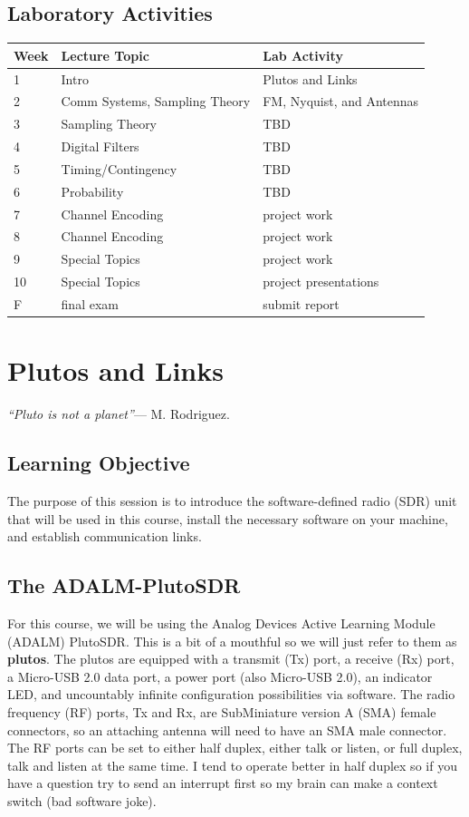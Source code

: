 \subsection{Laboratory Activities}
\begin{tabular}{ | m{1cm} | m{8cm}| m{8cm} |} 
    \hline
    Week & Lecture Topic & Lab Activity \\
    \hline
    1 & Intro & Plutos and Links\\ \hline
    2 & Comm Systems, Sampling Theory & FM, Nyquist, and Antennas \\ \hline
    3 & Sampling Theory & TBD\\ \hline
    4 & Digital Filters & TBD\\ \hline
    5 & Timing/Contingency & TBD \\ \hline
    6 & Probability & TBD \\ \hline
    7 & Channel Encoding & project work \\ \hline
    8 & Channel Encoding &  project work \\ \hline
    9 & Special Topics & project work \\ \hline
    10 & Special Topics & project presentations \\ \hline
    F & final exam & submit report \\ \hline 
\end{tabular}
\newpage

\section{Plutos and Links}
\textit{``Pluto is not a planet''}--- M. Rodriguez.

\setcounter{subsection}{-1}
\subsection{Learning Objective}
The purpose of this session is to introduce the software-defined radio (SDR) unit that will be used in this course, install the necessary software on your machine, and establish communication links.

\subsection{The ADALM-PlutoSDR}
For this course, we will be using the Analog Devices Active Learning Module (ADALM) PlutoSDR. This is a bit of a mouthful so we will just refer to them as \textbf{plutos}. The plutos are equipped with a transmit (Tx) port, a receive (Rx) port, a Micro-USB 2.0 data port, a power port (also Micro-USB 2.0), an indicator LED, and uncountably infinite configuration possibilities via software. The radio frequency (RF) ports, Tx and Rx, are SubMiniature version A (SMA) female connectors, so an attaching antenna will need to have an SMA male connector. The RF ports can be set to either half duplex, either talk or listen, or full duplex, talk and listen at the same time. I tend to operate better in half duplex so if you have a question try to send an interrupt first so my brain can make a context switch (bad software joke).


